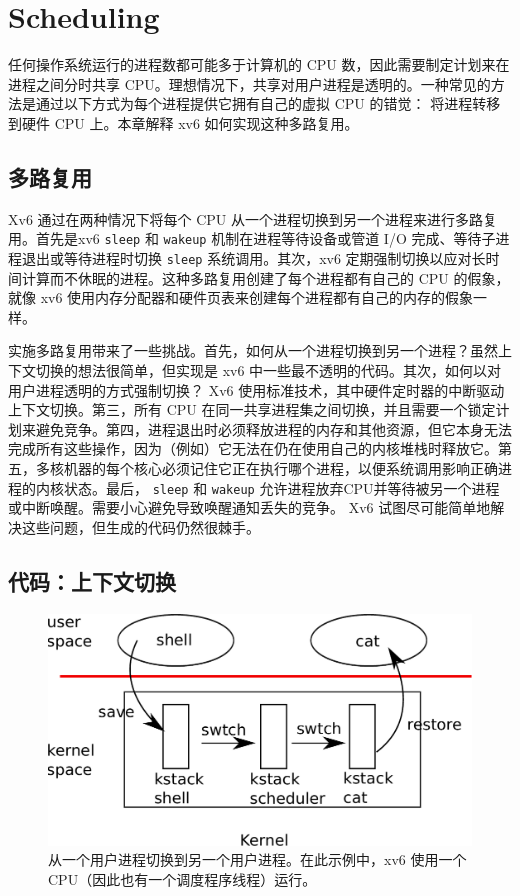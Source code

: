 \documentclass[UTF8]{article}
\begin{document}
   \chapter{Scheduling}   
    \label{CH:SCHED}     

任何操作系统运行的进程数都可能多于计算机的 CPU 数，因此需要制定计划来在进程之间分时共享 CPU。理想情况下，共享对用户进程是透明的。一种常见的方法是通过以下方式为每个进程提供它拥有自己的虚拟 CPU 的错觉：
        将进程转移到硬件 CPU 上。本章解释 xv6 如何实现这种多路复用。
    \section{多路复用  }     

Xv6 通过在两种情况下将每个 CPU 从一个进程切换到另一个进程来进行多路复用。首先是xv6
    \lstinline{sleep}    和
    \lstinline{wakeup}    机制在进程等待设备或管道 I/O 完成、等待子进程退出或等待进程时切换
    \lstinline{sleep}    系统调用。其次，xv6 定期强制切换以应对长时间计算而不休眠的进程。这种多路复用创建了每个进程都有自己的 CPU 的假象，就像 xv6 使用内存分配器和硬件页表来创建每个进程都有自己的内存的假象一样。  

实施多路复用带来了一些挑战。首先，如何从一个进程切换到另一个进程？虽然上下文切换的想法很简单，但实现是 xv6 中一些最不透明的代码。其次，如何以对用户进程透明的方式强制切换？ Xv6 使用标准技术，其中硬件定时器的中断驱动上下文切换。第三，所有 CPU 在同一共享进程集之间切换，并且需要一个锁定计划来避免竞争。第四，进程退出时必须释放进程的内存和其他资源，但它本身无法完成所有这些操作，因为（例如）它无法在仍在使用自己的内核堆栈时释放它。第五，多核机器的每个核心必须记住它正在执行哪个进程，以便系统调用影响正确进程的内核状态。最后，   \lstinline{sleep}   和   \lstinline{wakeup}   允许进程放弃CPU并等待被另一个进程或中断唤醒。需要小心避免导致唤醒通知丢失的竞争。 Xv6 试图尽可能简单地解决这些问题，但生成的代码仍然很棘手。
    \section{代码：上下文切换  }     

   \begin{figure}[t]
\center
\includegraphics[scale=0.5]{fig/switch.pdf}
\caption{从一个用户进程切换到另一个用户进程。在此示例中，xv6 使用一个 CPU（因此也有一个调度程序线程）运行。  }
\label{fig:switch}
\end{figure}     
\end{document}
